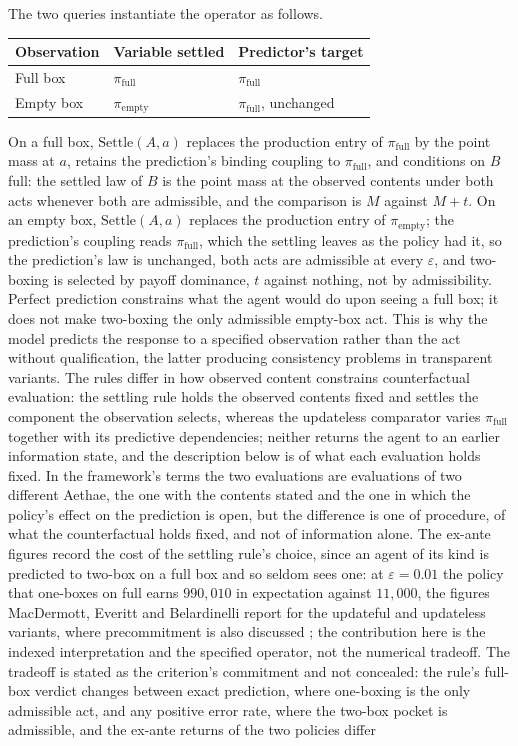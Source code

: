 \noindent The two queries instantiate the operator as follows.
\begin{center}\small
\begin{tabular}{lll}
\toprule
Observation & Variable settled & Predictor's target \\
\midrule
Full box & $\pi_{\mathrm{full}}$ & $\pi_{\mathrm{full}}$ \\
Empty box & $\pi_{\mathrm{empty}}$ & $\pi_{\mathrm{full}}$, unchanged \\
\bottomrule
\end{tabular}
\end{center}
\noindent On a full box, $\mathrm{Settle}(A, a)$ replaces the production entry of $\pi_{\mathrm{full}}$ by the point mass at $a$, retains the prediction's binding coupling to $\pi_{\mathrm{full}}$, and conditions on $B$ full: the settled law of $B$ is the point mass at the observed contents under both acts whenever both are admissible, and the comparison is $M$ against $M + t$. On an empty box, $\mathrm{Settle}(A, a)$ replaces the production entry of $\pi_{\mathrm{empty}}$; the prediction's coupling reads $\pi_{\mathrm{full}}$, which the settling leaves as the policy had it, so the prediction's law is unchanged, both acts are admissible at every $\varepsilon$, and two-boxing is selected by payoff dominance, $t$ against nothing, not by admissibility. Perfect prediction constrains what the agent would do upon seeing a full box; it does not make two-boxing the only admissible empty-box act. This is why the model predicts the response to a specified observation rather than the act without qualification, the latter producing consistency problems in transparent variants. The rules differ in how observed content constrains counterfactual evaluation: the settling rule holds the observed contents fixed and settles the component the observation selects, whereas the updateless comparator varies $\pi_{\mathrm{full}}$ together with its predictive dependencies; neither returns the agent to an earlier information state, and the description below is of what each evaluation holds fixed. In the framework's terms the two evaluations are evaluations of two different Aethae, the one with the contents stated and the one in which the policy's effect on the prediction is open, but the difference is one of procedure, of what the counterfactual holds fixed, and not of information alone. The ex-ante figures record the cost of the settling rule's choice, since an agent of its kind is predicted to two-box on a full box and so seldom sees one: at $\varepsilon = 0.01$ the policy that one-boxes on full earns $990{,}010$ in expectation against $11{,}000$, the figures MacDermott, Everitt and Belardinelli report for the updateful and updateless variants, where precommitment is also discussed \cite{macdermott2023characterising}; the contribution here is the indexed interpretation and the specified operator, not the numerical tradeoff. The tradeoff is stated as the criterion's commitment and not concealed: the rule's full-box verdict changes between exact prediction, where one-boxing is the only admissible act, and any positive error rate, where the two-box pocket is admissible, and the ex-ante returns of the two policies differ 